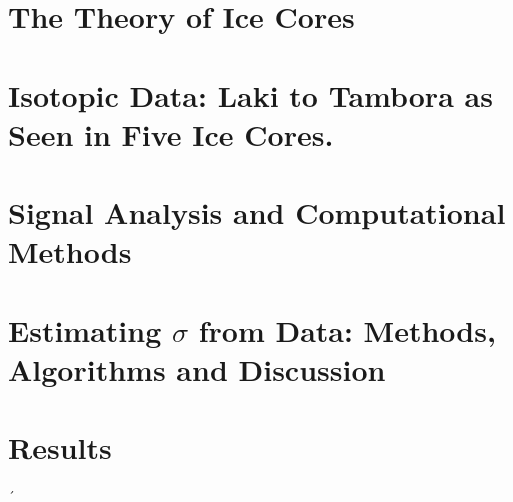 \documentclass[11pt]{memoir} %
\begin{document}
\chapter[Ice Theory][Ice Theory]{The Theory of Ice Cores}
\label{Chap:IceTheory}




\chapter[Data][Data]{Isotopic Data: Laki to Tambora as Seen in Five Ice Cores.}
\label{Chap:Data}





\chapter[Signal Analysis \& Comp. Meth.][Signal Analysis \& Comp. Meth.]{Signal Analysis and Computational Methods}
\label{Chap:SigAnalCompMeth}




%


\chapter[Method and Discussion][Method and Discussion]{Estimating $\sigma$ from Data: Methods, Algorithms and Discussion}
\label{Chap:MethodAndDiscussion}



\chapter[Results]{Results}

\label{Chap:Results}

´
%
\end{document}

